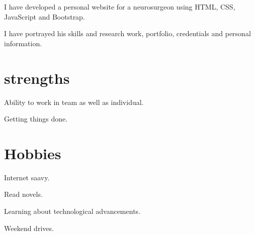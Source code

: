 \documentclass[]{deedy-resume-openfont}
\begin{document}
\begin{minipage}[t]{0.66\textwidth}


\begin{tightemize}
\item I have developed a personal website for a neurosurgeon using HTML, CSS, JavaScript and Bootstrap. 
\item I have portrayed his skills and research work, portfolio, credentials and personal information.



\end{tightemize}


\section{}

\section{strengths} 
\sectionsep

\begin{tightemize}
\item Ability to work in team as well as individual.
\item Getting things done. 



\end{tightemize}
\sectionsep


\section{Hobbies} 
\sectionsep

\begin{tightemize}
\item Internet saavy.
\item Read novels.
\item Learning about technological advancements. 
\item Weekend drives. 



\end{tightemize}
\sectionsep

\end{minipage} 
\end{document}
